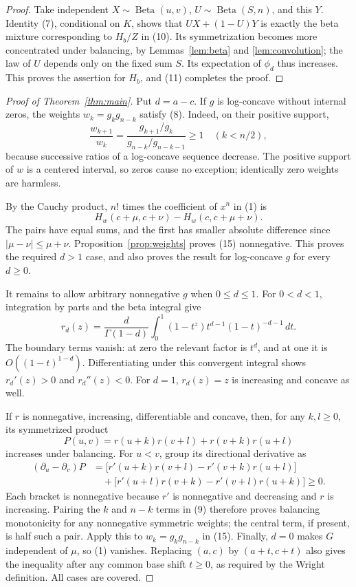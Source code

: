 \documentclass[10pt]{article}
\newcommand{\Be}{\operatorname{Beta}}
\begin{document}
\begin{proof}
Take independent \(X\sim\Be(u,v)\), \(U\sim\Be(S,n)\), and this \(Y\).
Identity (7), conditional on \(K\), shows that \(UX+(1-U)Y\) is exactly
the beta mixture corresponding to \(H_b/Z\) in (10).
Its symmetrization becomes more concentrated under balancing, by
Lemmas~\ref{lem:beta} and \ref{lem:convolution}; the law of \(U\) depends
only on the fixed sum \(S\). Its expectation of \(\phi_d\) thus increases.
This proves the assertion for \(H_b\), and (11) completes the proof.
\end{proof}

\begin{proof}[Proof of Theorem~\ref{thm:main}]
Put \(d=a-c\). If \(g\) is log-concave without internal zeros, the
weights \(w_k=g_kg_{n-k}\) satisfy (8). Indeed, on their positive support,
\[
 \frac{w_{k+1}}{w_k}
 =\frac{g_{k+1}/g_k}{g_{n-k}/g_{n-k-1}}\ge1\quad(k<n/2),
 \tag{14}
\]
because successive ratios of a log-concave sequence decrease.
The positive support of \(w\) is a centered interval, so zeros cause
no exception; identically zero weights are harmless.

By the Cauchy product, \(n!\) times the coefficient of \(x^n\) in (1) is
\[
 H_w(c+\mu,c+\nu)-H_w(c,c+\mu+\nu).           \tag{15}
\]
The pairs have equal sums, and the first has smaller absolute
difference since \(|\mu-\nu|\le\mu+\nu\). Proposition~\ref{prop:weights}
proves (15) nonnegative. This proves the required \(d>1\) case, and
also proves the result for log-concave \(g\) for every \(d\ge0\).

It remains to allow arbitrary nonnegative \(g\) when \(0\le d\le1\).
For \(0<d<1\), integration by parts and the beta integral give
\[
 r_d(z)=\frac d{\Gamma(1-d)}
 \int_0^1 (1-t^z)t^{d-1}(1-t)^{-d-1}\,dt.     \tag{16}
\]
The boundary terms vanish: at zero the relevant factor is \(t^d\),
and at one it is \(O((1-t)^{1-d})\). Differentiating under this
convergent integral shows \(r_d'(z)>0\) and \(r_d''(z)<0\).
For \(d=1\), \(r_d(z)=z\) is increasing and concave as well.

If \(r\) is nonnegative, increasing, differentiable and concave, then,
for any \(k,l\ge0\), its symmetrized product
\[
 P(u,v)=r(u+k)r(v+l)+r(v+k)r(u+l)
\]
increases under balancing. For \(u<v\), group its directional derivative as
\begin{align*}
 (\partial_u-\partial_v)P
 &=\bigl[r'(u+k)r(v+l)-r'(v+k)r(u+l)\bigr]\\
 &\quad+\bigl[r'(u+l)r(v+k)-r'(v+l)r(u+k)\bigr]\ge0.
\end{align*}
Each bracket is nonnegative because \(r'\) is nonnegative and decreasing
and \(r\) is increasing. Pairing the \(k\) and \(n-k\) terms in (9)
therefore proves balancing monotonicity for any nonnegative symmetric
weights; the central term, if present, is half such a pair.
Apply this to \(w_k=g_kg_{n-k}\) in (15). Finally, \(d=0\) makes \(G\)
independent of \(\mu\), so (1) vanishes. Replacing \((a,c)\) by
\((a+t,c+t)\) also gives the inequality after any common base shift
\(t\ge0\), as required by the Wright definition. All cases are covered.
\end{proof}
\end{document}
